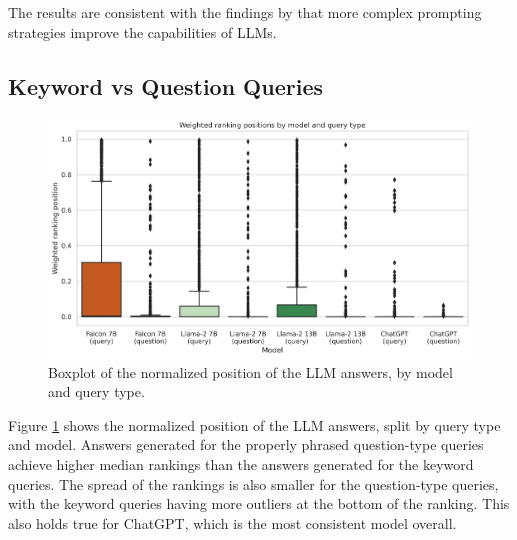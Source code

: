 The results are consistent with the findings by \cite{reynolds:2021:Prompt} that more complex prompting strategies improve the capabilities of LLMs.

\subsection{Keyword vs Question Queries}
\begin{figure}
    \centering
    \includegraphics[width=\textwidth]{images/weighted_position_boxplot_by_model_and_question.png}
    \caption{Boxplot of the normalized position of the LLM answers, by model and query type.}
    \label{fig:weighted_position_boxplot_by_model_and_question}
\end{figure}
Figure \ref{fig:weighted_position_boxplot_by_model_and_question} shows the normalized position of the LLM answers, split by query type and model.
Answers generated for the properly phrased question-type queries achieve higher median rankings than the answers generated for the keyword queries.
The spread of the rankings is also smaller for the question-type queries, with the keyword queries having more outliers at the bottom of the ranking.
This also holds true for ChatGPT, which is the most consistent model overall.


